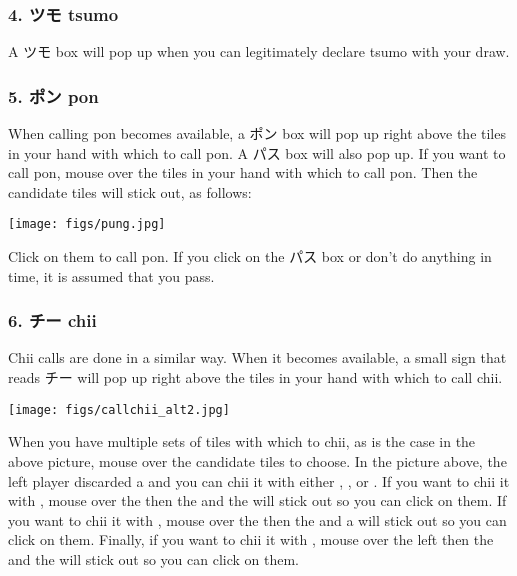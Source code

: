 \subsubsection{4. ツモ {\jap tsumo} \textipa{[ts\'umo]}}
A ツモ box will pop up when you can legitimately declare {\jap tsumo} with your draw. 

\subsubsection{5. ポン {\jap pon} \textipa{[p\'\textopeno\ng]}}
When calling {\jap pon} becomes available, a ポン box will pop up right above the tiles in your hand with which to call {\jap pon}. A パス box will also pop up. If you want to call {\jap pon}, mouse over the tiles in your hand with which to call {\jap pon}. Then the candidate tiles will stick out, as follows:
\begin{center}
\texttt{[image: figs/pung.jpg]}
\end{center}
Click on them to call {\jap pon}. If you click on the パス box or don't do anything in time, it is assumed that you pass. 

\subsubsection{6. チー {\jap chii} }
{\jap Chii} calls are done in a similar way. When it becomes available, a small sign that reads チー will pop up right above the tiles in your hand with which to call {\jap chii}. 

\begin{center}
\texttt{[image: figs/callchii\_alt2.jpg]}
\end{center}

When you have multiple sets of tiles with which to {\jap chii}, as is the case in the above picture, mouse over the candidate tiles to choose. In the picture above, the left player discarded a {\LARGE {}} and you can {\jap chii} it with either {\LARGE {}}, {\LARGE {}}, or {\LARGE {}}. If you want to {\jap chii} it with {\LARGE {}}, mouse over the {\LARGE{}} then the {\LARGE {}} and the {\LARGE {}} will stick out so you can click on them. If you want to {\jap chii} it with {\LARGE {}}, mouse over the {\LARGE{}} then the {\LARGE {}} and a {\LARGE {}} will stick out so you can click on them. Finally, if you want to {\jap chii} it with {\LARGE {}}, mouse over the left {\LARGE {}} then the {\LARGE {}} and the {\LARGE {}} will stick out so you can click on them. 

